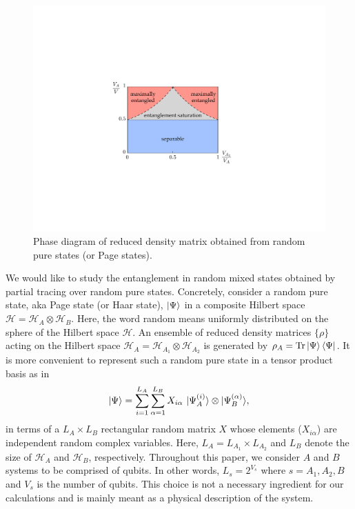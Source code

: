 \documentclass[aps,pra,groupedaddress,twocolumn,notitlepage,superscriptaddress,10pt]{revtex4-1}
\newcommand{\Hi}{\mathcal{H}}
\newcommand{\Tr}{\text{Tr}}
\begin{document}
\begin{figure}
\includegraphics[scale=0.6]{images/phase_diag.pdf}
\caption{\label{fig:phasediag} Phase diagram of reduced density matrix obtained from random pure states (or Page states).}
\end{figure}


We would like to study the entanglement in random mixed states obtained by partial tracing over random pure states.  Concretely, consider a random pure state, aka Page state (or Haar state),  $\ket{\Psi}$ in a composite Hilbert space $\Hi= \Hi_{A}\otimes \Hi_{B}$. Here, the word random means uniformly distributed on the sphere of the Hilbert space $\Hi$.
An ensemble of reduced density matrices $\{ \rho \}$ acting on the Hilbert space $\Hi_A=\Hi_{A_1}\otimes \Hi_{A_2}$ is generated by  $\rho_A=\Tr\ket{\Psi}\bra{\Psi}$.
It is more convenient to represent such a random pure state in
a tensor product basis as in
\begin{align}
\label{eq:page_tri}
\ket{\Psi}=\sum_{i=1}^{L_A} \sum_{\alpha=1}^{L_B} X_{i\alpha} \ |\Psi^{(i)}_{A} \rangle\otimes|\Psi^{(\alpha)}_B\rangle,
\end{align}
in terms of a $L_A \times L_B$ rectangular random matrix $X$
whose elements ($X_{i \alpha}$) are independent random complex variables. Here, $L_{A}=L_{A_1}\times L_{A_2}$ and $L_B$ denote the size of $\Hi_A$ and $\Hi_B$, respectively. Throughout this paper, we consider $A$ and $B$ systems to be comprised of qubits. In other words,  $L_s=2^{V_s}$ where $s=A_1,A_2,B$ and $V_s$ is the number of qubits. This choice is not a necessary ingredient for our calculations and is mainly meant as a physical description of the system.
\end{document}
